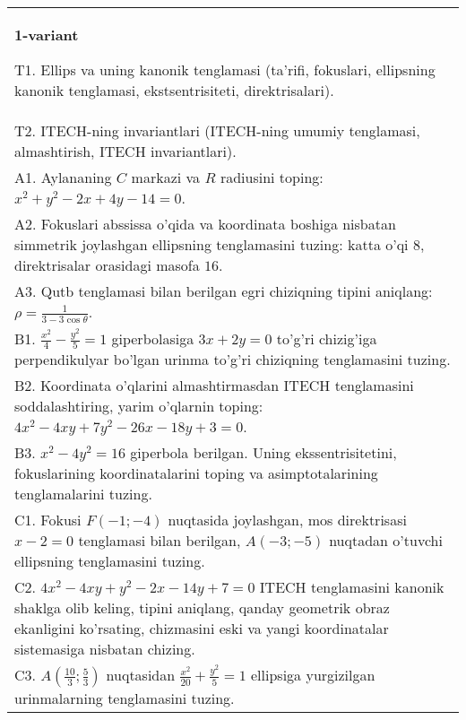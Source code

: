 \documentclass{article}
\begin{document}
\large
{}


\begin{tabular}{m{17cm}}
\textbf{1-variant}
\newline

T1. Ellips va uning kanonik tenglamasi (ta'rifi, fokuslari, ellipsning kanonik tenglamasi, ekstsentrisiteti, direktrisalari).\\

T2. ITECH-ning invariantlari (ITECH-ning umumiy tenglamasi, almashtirish, ITECH invariantlari).\\

A1. Aylananing $C$ markazi va $R$ radiusini toping: $x^2+y^2-2x+4y-14=0$.\\

A2. Fokuslari abssissa o'qida va koordinata boshiga nisbatan simmetrik joylashgan ellipsning tenglamasini tuzing: katta o'qi $8$, direktrisalar orasidagi masofa $16$.\\

A3. Qutb tenglamasi bilan berilgan egri chiziqning tipini aniqlang: $\rho=\frac{1}{3-3\cos\theta}$.\\

B1. $\frac{x^{2}}{4} - \frac{y^{2}}{5} = 1$ giperbolasiga $3x + 2y = 0$ to'g'ri chizig'iga perpendikulyar bo'lgan urinma to'g'ri chiziqning tenglamasini tuzing.\\

B2. Koordinata o'qlarini almashtirmasdan ITECH tenglamasini soddalashtiring, yarim o'qlarnin toping: $4x^{2} - 4xy + 7y^{2} - 26x - 18y + 3 = 0$.\\

B3. $x^{2} - 4y^{2} = 16$ giperbola berilgan. Uning ekssentrisitetini, fokuslarining koordinatalarini toping va asimptotalarining tenglamalarini tuzing.\\

C1. Fokusi $F( - 1; - 4)$ nuqtasida joylashgan, mos direktrisasi $x - 2 = 0$ tenglamasi bilan berilgan, $A( - 3; - 5)$ nuqtadan o'tuvchi ellipsning tenglamasini tuzing.  \\

C2. $4x^{2} - 4xy + y^{2} - 2x - 14y + 7 = 0$ ITECH tenglamasini kanonik shaklga olib keling, tipini aniqlang, qanday geometrik obraz ekanligini ko'rsating, chizmasini eski va yangi koordinatalar sistemasiga nisbatan chizing.  \\

C3. $A(\frac{10}{3};\frac{5}{3})$ nuqtasidan $\frac{x^{2}}{20} + \frac{y^{2}}{5} = 1$ ellipsiga yurgizilgan urinmalarning tenglamasini tuzing.  \\

\end{tabular}
\vspace{1cm}
\end{document}
